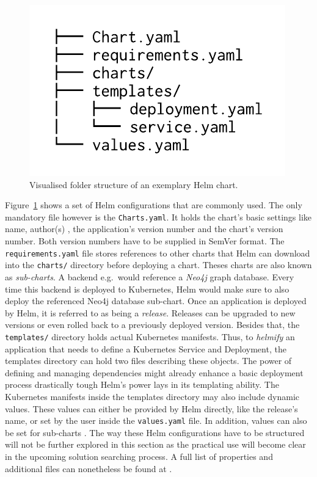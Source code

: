 \begin{figure}[H]
\begin{center}
  \includegraphics[scale=0.8]{images/figures/directory_listing_example_chart.pdf}
\end{center}
\caption{Visualised folder structure of an exemplary Helm chart.}%
\label{fig:helm_chart_folder_example}
\end{figure}

Figure~\ref{fig:helm_chart_folder_example} shows a set of Helm configurations
that are commonly used. The only mandatory file however is the
\texttt{Charts.yaml}. It holds the chart's basic settings like name, author(s)
, the application's version number and the chart's version number. Both version
numbers have to be supplied in SemVer format. The \texttt{requirements.yaml}
file stores references to other charts that Helm can download into the
\texttt{charts/} directory before deploying a chart. Theses charts are also
known as \textit{sub-charts}. A backend e.g.\ would reference a \textit{Neo4j}
graph database. Every time this backend is deployed to Kubernetes, Helm would
make sure to also deploy the referenced Neo4j database sub-chart. Once an
application is deployed by Helm, it is referred to as being a \textit{release}.
Releases can be upgraded to new versions or even rolled back to a previously
deployed version. Besides that, the \texttt{templates/} directory holds actual
Kubernetes manifests. Thus, to \textit{helmify} an application that needs to
define a Kubernetes Service and Deployment, the templates directory can hold
two files describing these objects. The power of defining and managing
dependencies might already enhance a basic deployment process drastically tough
Helm's power lays in its templating ability. The Kubernetes manifests inside
the templates directory may also include dynamic values. These values can
either be provided by Helm directly, like the release's name, or set by the
user inside the \texttt{values.yaml} file. In addition, values can also be set
for sub-charts \autocite{HelmDocumentationCharts}. The way these Helm
configurations have to be structured will not be further explored in this
section as the practical use will become clear in the upcoming solution
searching process. A full list of properties and additional files can
nonetheless be found at \autocite{HelmDocumentationCharts}.

